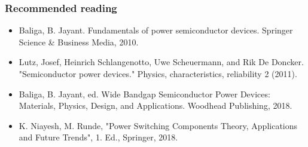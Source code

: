 \begin{frame}
	\frametitle{Recommended reading}
	\begin{itemize}
		\item Baliga, B. Jayant. Fundamentals of power semiconductor devices. Springer Science \& Business Media, 2010.
		\item Lutz, Josef, Heinrich Schlangenotto, Uwe Scheuermann, and Rik De Doncker. "Semiconductor power devices." Physics, characteristics, reliability 2 (2011).
		\item Baliga, B. Jayant, ed. Wide Bandgap Semiconductor Power Devices: Materials, Physics, Design, and Applications. Woodhead Publishing, 2018.
		\item K. Niayesh, M. Runde, "Power Switching Components Theory, Applications and Future Trends", 1. Ed., Springer, 2018.
	\end{itemize}
\end{frame}